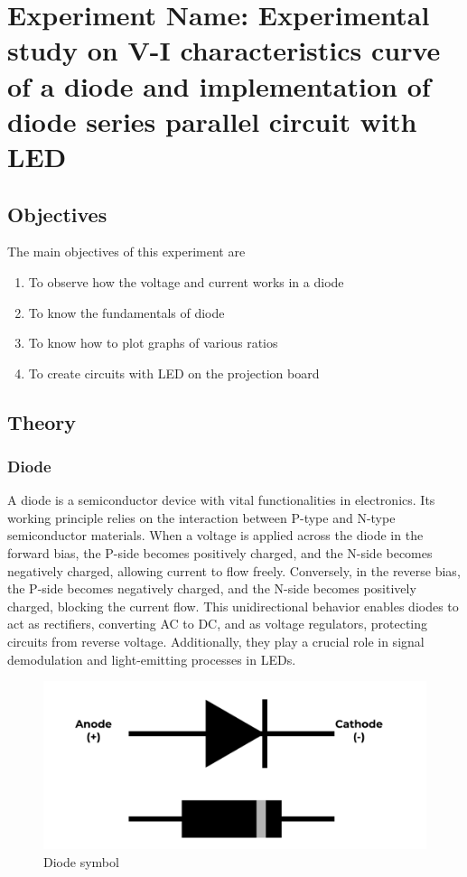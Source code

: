 

\chapter{Experiment Name: Experimental study on V-I characteristics curve of a diode and implementation of diode series parallel circuit with LED}
\label{exp1}


\section{Objectives}
The main objectives of this experiment are
\begin{enumerate}
    \item To observe how the voltage and current works in a diode
    \item To know the fundamentals of diode
    \item To know how to plot graphs of various ratios
    \item To create circuits with LED on the projection board
\end{enumerate}

\section{Theory}
\subsection{Diode}
A diode is a semiconductor device with vital functionalities in electronics. Its working principle relies on the interaction between P-type and N-type semiconductor materials. When a voltage is applied across the diode in the forward bias, the P-side becomes positively charged, and the N-side becomes negatively charged, allowing current to flow freely. Conversely, in the reverse bias, the P-side becomes negatively charged, and the N-side becomes positively charged, blocking the current flow. This unidirectional behavior enables diodes to act as rectifiers, converting AC to DC, and as voltage regulators, protecting circuits from reverse voltage. Additionally, they play a crucial role in signal demodulation and light-emitting processes in LEDs.
\begin{figure}[H]
    \centering
    \includegraphics[scale=0.15]{src/exp02/diode.png}
    \caption{Diode symbol}
\end{figure}

